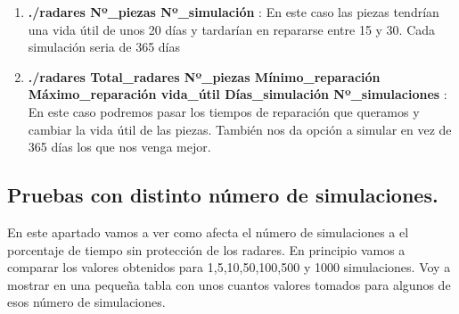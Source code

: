 \documentclass[]{article}
\begin{document}
 \begin{enumerate}
 	\item \textbf{./radares Nº\_piezas Nº\_simulación} : En este caso las piezas tendrían una vida útil de unos 20 días y tardarían en repararse entre 15 y 30. Cada simulación seria de 365 días
 	
 	\item \textbf{./radares Total\_radares Nº\_piezas Mínimo\_reparación Máximo\_reparación vida\_útil Días\_simulación Nº\_simulaciones} : En este caso podremos pasar los tiempos de reparación que queramos y cambiar la vida útil de las piezas. También nos da opción a simular en vez de 365 días los que nos venga mejor.
 \end{enumerate}

 
\subsection{Pruebas con distinto número de simulaciones.}
En este apartado vamos a ver como afecta el número de simulaciones a el porcentaje de tiempo sin protección de los radares. En principio vamos a comparar los valores obtenidos para 1,5,10,50,100,500 y 1000 simulaciones. Voy a mostrar en una pequeña tabla con unos cuantos valores tomados para algunos de esos número de simulaciones.
\end{document}
